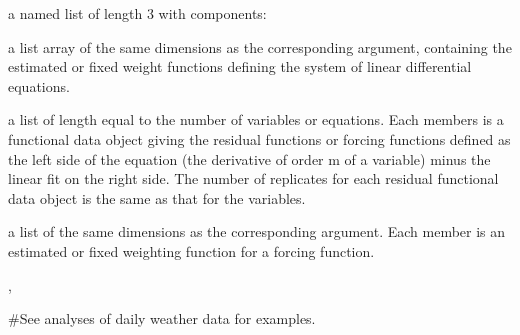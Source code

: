 \begin{Value}
a named list of length 3 with components:

\begin{ldescription}
\item[\code{bwtlist}] a list array of the same dimensions as the
corresponding argument, containing the estimated or fixed weight
functions defining the system of linear differential equations.

\item[\code{resfdlist}] a list of length equal to the number of variables
or equations.  Each members is a functional data object giving the
residual functions or forcing functions defined as the left side
of the equation (the derivative of order m of a variable) minus
the linear fit on the right side.  The number of replicates for each
residual functional data object is the same as that for the variables.

\item[\code{awtlist}] a list of the same dimensions as the corresponding
argument.  Each member is an estimated or fixed weighting function for
a forcing function.

\end{ldescription}
\end{Value}
\begin{SeeAlso}\relax
{}, 
\end{SeeAlso}
\begin{Examples}
\begin{ExampleCode}
#See analyses of daily weather data for examples.
\end{ExampleCode}
\end{Examples}

